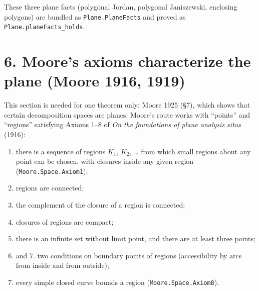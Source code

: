 \documentclass[11pt]{article}
\newcommand{\lean}[1]{\texttt{#1}}
\begin{document}
These three plane facts (polygonal Jordan, polygonal Janiszewski, enclosing polygons) are bundled as \lean{Plane.\hspace{0pt}PlaneFacts} and proved as \lean{Plane.\hspace{0pt}planeFacts\_\hspace{0pt}holds}.

\section*{6. Moore's axioms characterize the plane (Moore 1916, 1919)}

This section is needed for one theorem only: Moore 1925 (\S{}7), which shows that certain decomposition spaces are planes. Moore's route works with ``points'' and ``regions'' satisfying Axioms 1--8 of \emph{On the foundations of plane analysis situs} (1916):

\begin{enumerate}
  \item[1.] there is a sequence of regions $K_1$, $K_2$, \dots{} from which small regions about any point can be chosen, with closures inside any given region (\lean{Moore.\hspace{0pt}Space.\hspace{0pt}Axiom1});
  \item[2.] regions are connected;
  \item[3.] the complement of the closure of a region is connected;
  \item[4.] closures of regions are compact;
  \item[5.] there is an infinite set without limit point, and there are at least three points;
  \item[6.] and 7. two conditions on boundary points of regions (accessibility by arcs from inside and from outside);
  \item[8.] every simple closed curve bounds a region (\lean{Moore.\hspace{0pt}Space.\hspace{0pt}Axiom8}).
\end{enumerate}
\end{document}
